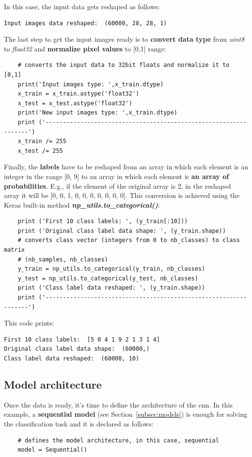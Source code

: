 In this case, the input data gets reshaped as follows:
\begin{Verbatim}[frame=single]
Input images data reshaped:  (60000, 28, 28, 1)
\end{Verbatim}

The last step to get the input images ready is to \textbf{convert data type} from \textit{uint8} to \textit{float32} and \textbf{normalize pixel values} to [0,1] range:
\begin{lstlisting}
    # converts the input data to 32bit floats and normalize it to [0,1]
    print('Input images type: ',x_train.dtype)
    x_train = x_train.astype('float32')
    x_test = x_test.astype('float32')
    print('New input images type: ',x_train.dtype)
    print ('-----------------------------------------------------------------')
    x_train /= 255
    x_test /= 255
\end{lstlisting}

Finally, the \textbf{labels} have to be reshaped from an array in which each element is an integer in the range [0, 9] to an array in which each element is \textbf{an array of probabilities}. E.g.,  if the element of the original array is 2, in the reshaped array it will be [0, 0, 1, 0, 0, 0, 0, 0, 0, 0]. This conversion is achieved using the Keras built-in method \textbf{\textit{np\_utils.to\_categorical()}}:
\begin{lstlisting}
    print ('First 10 class labels: ', (y_train[:10]))
    print ('Original class label data shape: ', (y_train.shape))
    # converts class vector (integers from 0 to nb_classes) to class matrix
    # (nb_samples, nb_classes)
    y_train = np_utils.to_categorical(y_train, nb_classes)
    y_test = np_utils.to_categorical(y_test, nb_classes)
    print ('Class label data reshaped: ', (y_train.shape))
    print ('-----------------------------------------------------------------')
\end{lstlisting}

This code prints:
\begin{Verbatim}[frame=single]
First 10 class labels:  [5 0 4 1 9 2 1 3 1 4]
Original class label data shape:  (60000,)
Class label data reshaped:  (60000, 10)
\end{Verbatim}

\subsection{Model architecture}
Once the data is ready, it's time to define the architecture of the \gls{cnn}. In this example, a \textbf{sequential model} (see Section~\ref{subsec:models}) is enough for solving the classification task and it is declared as follows:
\begin{lstlisting}
    # defines the model architecture, in this case, sequential
    model = Sequential()
\end{lstlisting}

